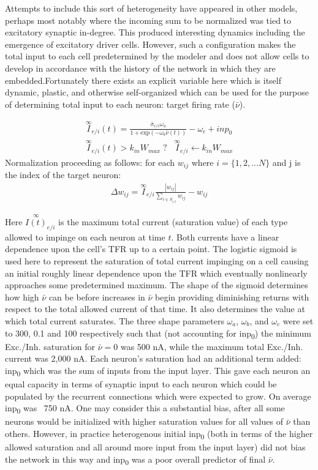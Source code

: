 \documentclass[10pt,letterpaper]{article}
\begin{document}
Attempts to include this sort of heterogeneity have appeared in other models, perhaps most notably \cite{effenberger2015self} where the incoming sum to be normalized was tied to excitatory synaptic in-degree. This produced interesting dynamics including the emergence of excitatory driver cells. However, such a configuration makes the total input to each cell predetermined by the modeler and does not allow cells to develop in accordance with the history of the network in which they are embedded.Fortunately there exists an explicit variable here which is itself dynamic, plastic, and otherwise self-organized which can be used for the purpose of determining total input to each neuron: target firing rate ($\bar{\nu}$). 
		
	\begin{gather}
		 \overset{\infty}{I}_{e/i}(t) = \frac{\bar{\sigma}_{e/i}\omega_a}{1+\text{exp}(-\omega_b\bar{\nu}(t))} - \omega_c + inp_0 \\
		 \overset{\infty}{I}_{e/i}(t) > k_{in}W_{max}\;?  \;\;\;
		 \overset{\infty}{I}_{e/i}\leftarrow k_{in}W_{max} 
	\end{gather}
	\label{Eqn:16}
		Normalization proceeding as follows: for each $w_{ij}$ where $ i = \{1, 2, ... N\}$ and j is the index of the target neuron:
		\begin{gather}
			\Delta w_{ij} = \overset{\infty}{I}_{e/i}\frac{|w_{ij}|}{\sum_{i \in S_{e/i}} w_{ij}} - w_{ij}
		\end{gather}

Here $\overset{\infty}{I(t)}_{e/i}$ is the maximum total current (saturation value) of each type allowed to impinge on each neuron at time $t$. Both currents have a linear dependence upon the cell's TFR up to a certain point. The logistic sigmoid is used here to represent the saturation of total current impinging on a cell causing an initial roughly linear dependence upon the TFR which eventually nonlinearly approaches some predetermined maximum. The shape of the sigmoid determines how high $\bar{\nu}$ can be before increases in $\bar{\nu}$ begin providing diminishing returns with respect to the total allowed current of that time. It also determines the value at which total current saturates. The three shape parameters $\omega_a$, $\omega_b$, and $\omega_c$ were set to 300, 0.1 and 100 respectively such that (not accounting for inp\textsubscript{0}) the minimum Exc./Inh. saturation for $\bar{\nu} = 0$ was 500 nA, while the maximum total Exc./Inh. current was 2,000 nA. Each neuron's saturation 
had an additional term added: inp\textsubscript{0} which was the sum of inputs from the input layer. This gave each neuron an equal capacity  in terms of synaptic input to each neuron which could be populated by the recurrent connections which were expected to grow. On average inp\textsubscript{0} was ~750 nA. One may consider this a substantial bias, after all some neurons would be initialized with higher saturation values for all values of $\bar{\nu}$ than others. However, in practice heterogenous initial inp\textsubscript{0} (both in terms of the higher allowed saturation and all around more input from the input layer) did not bias the network in this way and inp\textsubscript{0} was a poor overall predictor of final $\bar{\nu}$.
		
\end{document}
